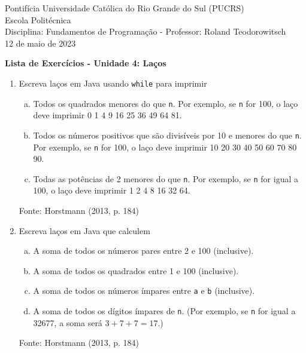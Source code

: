 \documentclass[onecolumn,a4paper,10pt]{report}
\newcommand{\+}{\, + \,}
\newcommand{\<}{\hspace*{-0.4cm}}
\begin{document}
\singlespacing

\begin{center}
Pontifícia Universidade Católica do Rio Grande do Sul (PUCRS)\\
Escola Politécnica\\
Disciplina: Fundamentos de Programação - Professor: Roland Teodorowitsch\\
12 de maio de 2023
\end{center}

\begin{center}
\textbf{Lista de Exercícios - Unidade 4: Laços}
\end{center}

\begin{enumerate}[1.]

\item Escreva laços em Java usando \texttt{while} para imprimir
\begin{enumerate}[a)]
	\item Todos os quadrados menores do que \texttt{n}. Por exemplo, se \texttt{n} for 100, o laço deve imprimir 0 1 4 9 16 25 36 49 64 81.
	\item Todos os números positivos que são divisíveis por 10 e menores do que \texttt{n}. Por exemplo, se \texttt{n} for 100, o laço deve imprimir 10 20 30 40 50 60 70 80 90.
	\item Todas as potências de 2 menores do que \texttt{n}. Por exemplo, se \texttt{n} for igual a 100, o laço deve imprimir 1 2 4 8 16 32 64.
\end{enumerate}
{\tiny Fonte: Horstmann (2013, p. 184)}

\item Escreva laços em Java que calculem
\begin{enumerate}[a)]
	\item A soma de todos os números pares entre 2 e 100 (inclusive).
	\item A soma de todos os quadrados entre 1 e 100 (inclusive).
	\item A soma de todos os números ímpares entre \texttt{a} e \texttt{b} (inclusive).
	\item A soma de todos os dígitos ímpares de \texttt{n}. (Por exemplo, se \texttt{n} for igual a 32677, a soma será $3 + 7 + 7 = 17$.)
\end{enumerate}
{\tiny Fonte: Horstmann (2013, p. 184)}


\end{enumerate}
\end{document}
